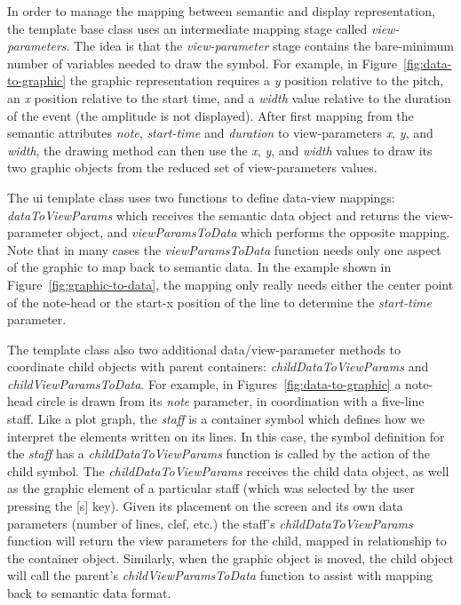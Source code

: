 \documentclass{article}
\begin{document}
In order to manage the mapping between semantic and display representation, the template base class uses an intermediate mapping stage called \textit{view-parameters}.
The idea is that the \textit{view-parameter} stage contains the bare-minimum number of variables needed to draw the symbol.
For example, in Figure~\ref{fig:data-to-graphic} the graphic representation requires a \textit{y} position relative to the pitch, an \textit{x} position relative to the start time, and a \textit{width} value relative to the duration of the event (the amplitude is not displayed).
After first mapping from the semantic attributes \textit{note}, \textit{start-time} and \textit{duration} to view-parameters \textit{x}, \textit{y}, and \textit{width}, the drawing method can then use the \textit{x}, \textit{y}, and \textit{width} values to draw its two graphic objects from the reduced set of view-parameters values.

The ui template class uses two functions to define data-view mappings: \textit{dataToViewParams} which receives the semantic data object and returns the view-parameter object, and \textit{viewParamsToData} which performs the opposite mapping.
Note that in many cases the \textit{viewParamsToData} function needs only one aspect of the graphic to map back to semantic data. In the example shown in Figure~\ref{fig:graphic-to-data}, the mapping only really needs either the center point of the note-head or the start-x position of the line to determine the \textit{start-time} parameter.

The template class also two additional data/view-parameter methods to coordinate child objects with parent containers: \textit{childDataToViewParams} and \textit{childViewParamsToData}.
For example, in Figures~\ref{fig:data-to-graphic} a note-head circle is drawn from its \textit{note} parameter, in coordination with a five-line staff.
Like a plot graph, the \textit{staff} is a container symbol which defines how we interpret the elements written on its lines. 
In this case, the symbol definition for the \textit{staff} has a \textit{childDataToViewParams} function is called by the action of the child symbol. 
The \textit{childDataToViewParams} receives the child data object, as well as the graphic element of a particular staff (which was selected by the user pressing the [s] key). Given its placement on the screen and its own data parameters (number of lines, clef, etc.) the staff's \textit{childDataToViewParams} function will return the view parameters for the child, mapped in relationship to the container object.
Similarly, when the graphic object is moved, the child object will call the parent's \textit{childViewParamsToData} function to assist with mapping back to semantic data format.
\end{document}
